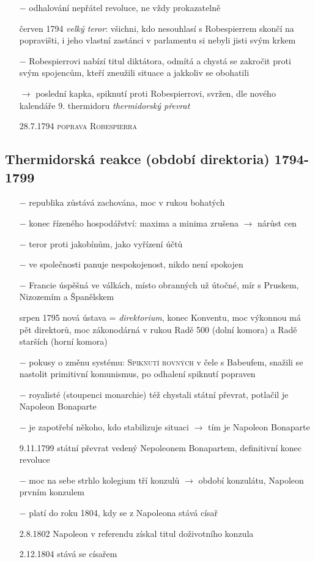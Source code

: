 \documentclass{article}
\begin{document}
\begin{itemize}
    \item[$-$] odhalování nepřátel revoluce, ne vždy prokazatelně
    \item[červen 1794] \textit{velký teror}: všichni, kdo nesouhlasí s Robespierrem skončí na popravišti, i jeho vlastní zastánci v parlamentu si nebyli jisti svým krkem
    \item[$-$] Robespierrovi nabízí titul diktátora, odmítá a chystá se zakročit proti svým spojencům, kteří zneužili situace a jakkoliv se obohatili
    \item[$\rightarrow$ ]  poslední kapka, spiknutí proti Robespierrovi, svržen, dle nového kalendáře 9. thermidoru \textit{thermidorský převrat}
    \item[28.7.1794]  \textsc{poprava Robespierra}
\end{itemize}

\subsection*{Thermidorská reakce (období direktoria) 1794-1799}
\begin{itemize}
    \vspace{-0.5em}
    \setlength\itemsep{0.15em}
    \item[$-$] republika zůstává zachována, moc v rukou bohatých
    \item[$-$] konec řízeného hospodářství: maxima a minima zrušena $\rightarrow$ nárůst cen
    \item[$-$] teror proti jakobínům, jako vyřízení účtů
    \item[$-$] ve společnosti panuje nespokojenost, nikdo není spokojen
    \item[$-$] Francie úspěšná ve válkách, místo obranných už útočné, mír s Pruskem, Nizozemím a Španělskem
    \item[srpen 1795] nová ústava = \textit{direktorium}, konec Konventu, moc výkonnou má pět direktorů,  moc zákonodárná v rukou Radě 500 (dolní komora) a Radě starších (horní komora)
    \item[$-$] pokusy o změnu systému: \textsc{Spiknutí rovných} v čele s Babeufem, snažili se nastolit primitivní komunismus, po odhalení spiknutí popraven
    \item[$-$] royalisté (stoupenci monarchie) též chystali státní převrat, potlačil je Napoleon Bonaparte
    \item[$-$] je zapotřebí někoho, kdo stabilizuje situaci $\rightarrow$ tím je Napoleon Bonaparte
    \item[9.11.1799] státní převrat vedený Nepoleonem Bonapartem, definitivní konec revoluce
    \item[$-$] moc na sebe strhlo kolegium tří konzulů $\rightarrow$ období konzulátu, Napoleon prvním konzulem
    \item[$-$] platí do roku 1804, kdy se z Napoleona stává císař
    \item[2.8.1802] Napoleon v referendu získal titul doživotního konzula
    \item[2.12.1804] stává se císařem
\end{itemize}
\end{document}
